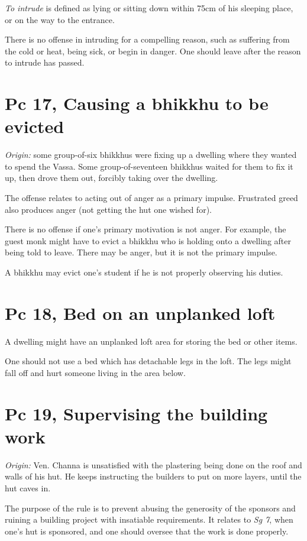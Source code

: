 \emph{To intrude} is defined as lying or sitting down within 75cm of his
sleeping place, or on the way to the entrance.

There is no offense in intruding for a compelling reason, such as
suffering from the cold or heat, being sick, or begin in danger. One
should leave after the reason to intrude has passed.

\clearpage

\section{Pc 17, Causing a bhikkhu to be evicted}

\emph{Origin:} some group-of-six bhikkhus were fixing up a dwelling
where they wanted to spend the Vassa. Some group-of-seventeen bhikkhus
waited for them to fix it up, then drove them out, forcibly taking over
the dwelling.

The offense relates to acting out of anger as a primary impulse.
Frustrated greed also produces anger (not getting the hut one wished
for).

There is no offense if one's primary motivation is not anger. For
example, the guest monk might have to evict a bhikkhu who is holding
onto a dwelling after being told to leave. There may be anger, but it is
not the primary impulse.

A bhikkhu may evict one's student if he is not properly observing his
duties.

\section{Pc 18, Bed on an unplanked loft}

A dwelling might have an unplanked loft area for storing the bed or
other items.

One should not use a bed which has detachable legs in the loft. The legs
might fall off and hurt someone living in the area below.

\section{Pc 19, Supervising the building work}

\emph{Origin:} Ven. Channa is unsatisfied with the plastering being done
on the roof and walls of his hut. He keeps instructing the builders to
put on more layers, until the hut caves in.

The purpose of the rule is to prevent abusing the generosity of the
sponsors and ruining a building project with insatiable requirements. It
relates to \emph{Sg 7}, when one's hut is sponsored, and one should
oversee that the work is done properly.

